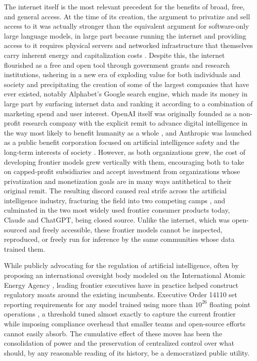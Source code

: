\documentclass[10pt,a4paper,twocolumn]{article}
\begin{document}
The internet itself is the most relevant precedent for the benefits of broad, free, and general access. At the time of its creation, the argument to privatize and sell access to it was actually stronger than the equivalent argument for software-only large language models, in large part because running the internet and providing access to it requires physical servers and networked infrastructure that themselves carry inherent energy and capitalization costs \citep{leiner2009history}. Despite this, the internet flourished as a free and open tool through government grants and research institutions, ushering in a new era of exploding value for both individuals and society and precipitating the creation of some of the largest companies that have ever existed, notably Alphabet's Google search engine, which made its money in large part by surfacing internet data and ranking it according to a combination of marketing spend and user interest. OpenAI itself was originally founded as a non-profit research company with the explicit remit to advance digital intelligence in the way most likely to benefit humanity as a whole \citep{openai2015intro}, and Anthropic was launched as a public benefit corporation focused on artificial intelligence safety and the long-term interests of society \citep{anthropic2021intro}. However, as both organizations grew, the cost of developing frontier models grew vertically with them, encouraging both to take on capped-profit subsidiaries and accept investment from organizations whose privatization and monetization goals are in many ways antithetical to their original remit. The resulting discord caused real strife across the artificial intelligence industry, fracturing the field into two competing camps \citep[ch.~13]{hao2025empire}, and culminated in the two most widely used frontier consumer products today, Claude and ChatGPT, being closed source. Unlike the internet, which was open-sourced and freely accessible, these frontier models cannot be inspected, reproduced, or freely run for inference by the same communities whose data trained them.

While publicly advocating for the regulation of artificial intelligence, often by proposing an international oversight body modeled on the International Atomic Energy Agency \citep{altman2023senate}, leading frontier executives have in practice helped construct regulatory moats around the existing incumbents. Executive Order 14110 set reporting requirements for any model trained using more than $10^{26}$ floating point operations \citep{whitehouse2023eo}, a threshold tuned almost exactly to capture the current frontier while imposing compliance overhead that smaller teams and open-source efforts cannot easily absorb. The cumulative effect of these moves has been the consolidation of power and the preservation of centralized control over what should, by any reasonable reading of its history, be a democratized public utility.
\end{document}
